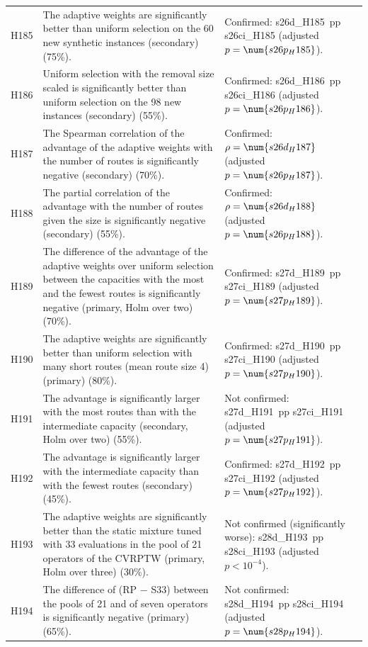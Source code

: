 \begin{center}
\begin{longtable}{>{\raggedright\arraybackslash}p{0.9cm}>{\raggedright\arraybackslash}p{5.2cm}>{\raggedright\arraybackslash}p{8.5cm}}
H185 & The adaptive weights are significantly better than uniform selection on the 60 new synthetic instances (secondary) (75\%). & Confirmed: \num{s26d_H185}~pp \num{s26ci_H185} (adjusted $p=\num{s26p_H185}$). \\
H186 & Uniform selection with the removal size scaled is significantly better than uniform selection on the 98 new instances (secondary) (55\%). & Confirmed: \num{s26d_H186}~pp \num{s26ci_H186} (adjusted $p=\num{s26p_H186}$). \\
H187 & The Spearman correlation of the advantage of the adaptive weights with the number of routes is significantly negative (secondary) (70\%). & Confirmed: $\rho=\num{s26d_H187}$ (adjusted $p=\num{s26p_H187}$). \\
H188 & The partial correlation of the advantage with the number of routes given the size is significantly negative (secondary) (55\%). & Confirmed: $\rho=\num{s26d_H188}$ (adjusted $p=\num{s26p_H188}$). \\
H189 & The difference of the advantage of the adaptive weights over uniform selection between the capacities with the most and the fewest routes is significantly negative (primary, Holm over two) (70\%). & Confirmed: \num{s27d_H189}~pp \num{s27ci_H189} (adjusted $p=\num{s27p_H189}$). \\
H190 & The adaptive weights are significantly better than uniform selection with many short routes (mean route size 4) (primary) (80\%). & Confirmed: \num{s27d_H190}~pp \num{s27ci_H190} (adjusted $p=\num{s27p_H190}$). \\
H191 & The advantage is significantly larger with the most routes than with the intermediate capacity (secondary, Holm over two) (55\%). & Not confirmed: \num{s27d_H191}~pp \num{s27ci_H191} (adjusted $p=\num{s27p_H191}$). \\
H192 & The advantage is significantly larger with the intermediate capacity than with the fewest routes (secondary) (45\%). & Confirmed: \num{s27d_H192}~pp \num{s27ci_H192} (adjusted $p=\num{s27p_H192}$). \\
H193 & The adaptive weights are significantly better than the static mixture tuned with 33 evaluations in the pool of 21 operators of the CVRPTW (primary, Holm over three) (30\%). & Not confirmed (significantly worse): \num{s28d_H193}~pp \num{s28ci_H193} (adjusted $p<10^{-4}$). \\
H194 & The difference of (RP $-$ S33) between the pools of 21 and of seven operators is significantly negative (primary) (65\%). & Not confirmed: \num{s28d_H194}~pp \num{s28ci_H194} (adjusted $p=\num{s28p_H194}$). \\

\end{longtable}
\end{center}
